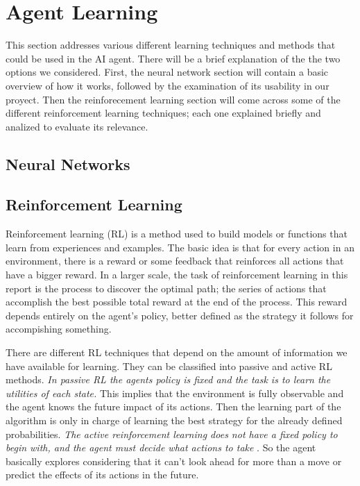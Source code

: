 \section{Agent Learning}\label{agent_learning}

This section addresses various different learning techniques and methods that could be used in the AI agent. There will be a brief explanation of the the two options we considered. First, the neural network section will contain a basic overview of how it works, followed by the examination of its usability in our proyect. Then the reinforecement learning section will come across some of the different reinforcement learning techniques;  each one explained briefly and analized to evaluate its relevance. 

\subsection*{Neural Networks}


\subsection*{Reinforcement Learning}
Reinforcement learning (RL) is a method used to build models or functions that learn from experiences and examples. The basic idea is that for every action in an environment, there is a reward or some feedback that reinforces all actions that have a bigger reward. In a larger scale, the task of reinforcement learning in this report is the process to discover the optimal path; the series of actions that accomplish the best possible total reward at the end of the process. This reward depends entirely on the agent's policy, better defined as the strategy it follows for accompishing something. 

There are different RL techniques that depend on the amount of information we have available for learning. They can be classified into passive and active RL methods. \textit{In passive RL the agents policy is fixed and the task is to learn the utilities of each state.} \cite[p764]{rl} This implies that the environment is fully observable and the agent knows the future impact of its actions. Then the learning part of the algorithm is only in charge of learning the best strategy for the already defined probabilities. \textit{The active reinforcement learning does not have a fixed policy to begin with, and the agent must decide what actions to take} \cite[p771]{rl}. So the agent basically explores considering that it can't look ahead for more than a move or predict the effects of its actions in the future.

